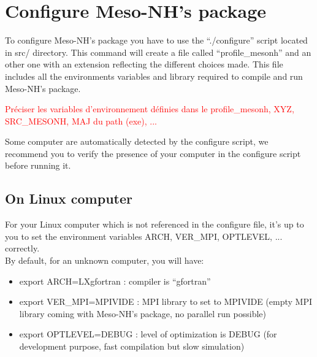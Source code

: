 \section{Configure Meso-NH's package}
\label{sec:configure_mesonh_package}
  
To configure Meso-NH's package you have to use the ``./configure'' script located in src/ directory. This command will create a file called ``profile\_mesonh'' and an other one with an extension reflecting the different choices made. This file includes all the environments variables and library required to compile and run Meso-NH's package. \\

\begin{noteblock}
\textcolor{red}{Préciser les variables d'environnement définies dans le profile\_mesonh, XYZ, SRC\_MESONH, MAJ du path (exe), ...}
\end{noteblock}

Some computer are automatically detected by the configure script, we recommend you to verify the presence of your computer in the configure script before running it.

\subsection{On Linux computer}

For your Linux computer which is not referenced in the configure file, it's up to you to set the environment variables ARCH, VER\_MPI, OPTLEVEL, ... correctly. \\

By default, for an unknown computer, you will have:
\begin{itemize}
\item export ARCH=LXgfortran : compiler is ``gfortran''
\item export VER\_MPI=MPIVIDE : MPI library to set to MPIVIDE (empty MPI library coming with Meso-NH's package, no parallel run possible)
\item export OPTLEVEL=DEBUG : level of optimization is DEBUG (for development purpose, fast compilation but slow simulation) \\
\end{itemize} 


